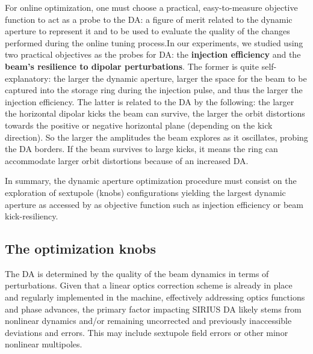 For online optimization, one must choose a practical, easy-to-measure objective function to act as a probe to the DA: a figure of merit related to the dynamic aperture to represent it and to be used to evaluate the quality of the changes performed during the online tuning process.In our experiments, we studied using two practical objectives as the probes for DA: the \textbf{injection efficiency} and the \textbf{beam's resilience to dipolar perturbations}. The former is quite self-explanatory: the larger the dynamic aperture, larger the space for the beam to be captured into the storage ring during the injection pulse, and thus the larger the injection efficiency. The latter is related to the DA by the following: the larger the horizontal dipolar kicks the beam can survive, the larger the orbit distortions towards the positive or negative horizontal plane (depending on the kick direction). So the larger the amplitudes the beam explores as it oscillates, probing the DA borders. If the beam survives to large kicks, it means the ring can accommodate larger orbit distortions because of an increased DA.


In summary, the dynamic aperture optimization procedure must consist on the exploration of sextupole (knobs) configurations yielding the largest dynamic aperture as accessed by as objective function such as injection efficiency or beam kick-resiliency.

\subsection{The optimization knobs}
\label{subsec:knobs}
The DA is determined by the quality of the beam dynamics in terms of perturbations. Given that a linear optics correction scheme is already in place and regularly implemented in the machine, effectively addressing optics functions and phase advances, the primary factor impacting SIRIUS DA likely stems from nonlinear dynamics and/or remaining uncorrected and previously inaccessible deviations and errors. This may include sextupole field errors or other minor nonlinear multipoles.

